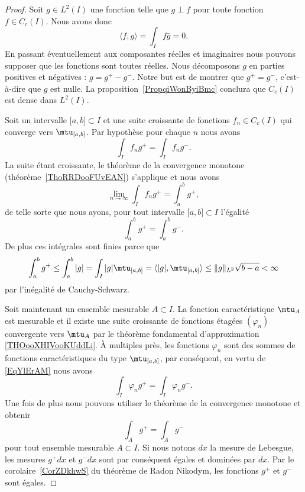 \begin{proof}
	Soit \( g\in L^2(I)\) une fonction telle que \( g\perp f\) pour toute fonction \( f\in C_c(I)\). Nous avons donc
	\begin{equation}
		\langle f, g\rangle =\int_If\bar g=0.
	\end{equation}
	En passant éventuellement aux composantes réelles et imaginaires nous pouvons supposer que les fonctions sont toutes réelles. Nous décomposons \( g\) en parties positives et négatives : \( g=g^+-g^-\). Notre but est de montrer que \( g^+=g^-\), c'est-à-dire que \( g\) est nulle. La proposition~\ref{PropqiWonByiBmc} conclura que \( C_c(I)\) est dense dans \( L^2(I)\).

	Soit un intervalle \( \mathopen[ a , b \mathclose]\subset I\) et une suite croissante de fonctions \( f_n\in C_c(I)\) qui converge vers \( \mtu_{\mathopen[ a , b \mathclose]}\). Par hypothèse pour chaque \( n\) nous avons
	\begin{equation}
		\int_If_ng^+=\int_I f_ng^-.
	\end{equation}
	La suite étant croissante, le théorème de la convergence monotone (théorème~\ref{ThoRRDooFUvEAN}) s'applique et nous avons
	\begin{equation}
		\lim_{n\to \infty} \int_I f_ng^+=\int_a^bg^+,
	\end{equation}
	de telle sorte que nous ayons, pour tout intervalle \( \mathopen[ a , b \mathclose]\subset I\) l'égalité
	\begin{equation}        \label{EqYlErAM}
		\int_a^bg^+=\int_a^bg^-.
	\end{equation}
	De plus ces intégrales sont finies parce que
	\begin{equation}
		\int_a^b g^+\leq\int_a^b| g |=\int_I| g |\mtu_{\mathopen[ a , b \mathclose]}=\langle | g |, \mtu_{\mathopen[ a , b \mathclose]}\rangle \leq \| g \|_{L^2}\sqrt{b-a}<\infty
	\end{equation}
	par l'inégalité de Cauchy-Schwarz.

	Soit maintenant un ensemble mesurable \( A\subset I\). La fonction caractéristique \( \mtu_A\) est mesurable et il existe une suite croissante de fonctions étagées \( (\varphi_n)\) convergente vers \( \mtu_A\) par le théorème fondamental d'approximation \ref{THOooXHIVooKUddLi}. À multiples près, les fonctions \( \varphi_n\) sont des sommes de fonctions caractéristiques du type \( \mtu_{\mathopen[ a , b \mathclose]}\), par conséquent, en vertu de \eqref{EqYlErAM} nous avons
	\begin{equation}
		\int_I\varphi_ng^+=\int_I\varphi_ng^-.
	\end{equation}
	Une fois de plus nous pouvons utiliser le théorème de la convergence monotone et obtenir
	\begin{equation}
		\int_Ag^+=\int_A g^-
	\end{equation}
	pour tout ensemble mesurable \( A\subset I\). Si nous notons \( dx\) la mesure de Lebesgue, les mesures \( g^+dx\) et \( g^-dx\) sont par conséquent égales et dominées par \( dx\). Par le corolaire~\ref{CorZDkhwS} du théorème de Radon Nikodym, les fonctions \( g^+\) et \( g^-\) sont égales.
\end{proof}


